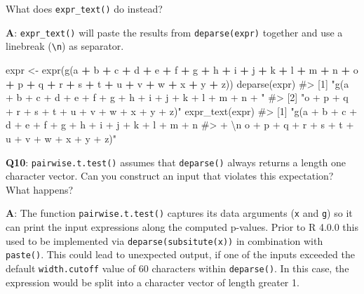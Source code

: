 \documentclass[
]{krantz}
\makeatletter
\newenvironment{Shaded}{\begin{snugshade}}{\end{snugshade}}
\newcommand{\CommentTok}[1]{\textcolor[rgb]{0.56,0.35,0.01}{\textit{#1}}}
\newcommand{\KeywordTok}[1]{\textcolor[rgb]{0.13,0.29,0.53}{\textbf{#1}}}
\newcommand{\NormalTok}[1]{#1}
\newcommand{\OperatorTok}[1]{\textcolor[rgb]{0.81,0.36,0.00}{\textbf{#1}}}
\newcommand{\StringTok}[1]{\textcolor[rgb]{0.31,0.60,0.02}{#1}}
\newenvironment{kframe}{%
\medskip{}
\setlength{\fboxsep}{.8em}
 \def\at@end@of@kframe{}%
 \ifinner\ifhmode%
  \def\at@end@of@kframe{\end{minipage}}%
  \begin{minipage}{\columnwidth}%
 \fi\fi%
 \def\FrameCommand##1{\hskip\@totalleftmargin \hskip-\fboxsep
 \colorbox{shadecolor}{##1}\hskip-\fboxsep
     \hskip-\linewidth \hskip-\@totalleftmargin \hskip\columnwidth}%
 \MakeFramed {\advance\hsize-\width
   \@totalleftmargin\z@ \linewidth\hsize
   \@setminipage}}%
 {\par\unskip\endMakeFramed%
 \at@end@of@kframe}
\renewenvironment{Shaded}{\begin{kframe}}{\end{kframe}}
\renewcommand{\KeywordTok} [1]{\textcolor[rgb]{0.00,0.44,0.13}{{#1}}}
\renewcommand{\StringTok}  [1]{\textcolor[rgb]{0.25,0.44,0.63}{{#1}}}
\renewcommand{\CommentTok} [1]{\textcolor[rgb]{0.38,0.63,0.69}{{#1}}}
\renewcommand{\NormalTok}  [1]{{#1}}
\makeatother
\begin{document}
What does \texttt{expr\_text()} do instead?

\textbf{{A}}: \texttt{expr\_text()} will paste the results from \texttt{deparse(expr)} together and use a linebreak (\texttt{\textbackslash{}n}) as separator.

\begin{Shaded}
\begin{Highlighting}[]
\NormalTok{expr <-}\StringTok{ }\KeywordTok{expr}\NormalTok{(}\KeywordTok{g}\NormalTok{(a }\OperatorTok{+}\StringTok{ }\NormalTok{b }\OperatorTok{+}\StringTok{ }\NormalTok{c }\OperatorTok{+}\StringTok{ }\NormalTok{d }\OperatorTok{+}\StringTok{ }\NormalTok{e }\OperatorTok{+}\StringTok{ }\NormalTok{f }\OperatorTok{+}\StringTok{ }\NormalTok{g }\OperatorTok{+}\StringTok{ }\NormalTok{h }\OperatorTok{+}\StringTok{ }\NormalTok{i }\OperatorTok{+}\StringTok{ }\NormalTok{j }\OperatorTok{+}\StringTok{ }\NormalTok{k }\OperatorTok{+}\StringTok{ }\NormalTok{l }\OperatorTok{+}\StringTok{ }\NormalTok{m }\OperatorTok{+}\StringTok{ }
\StringTok{                 }\NormalTok{n }\OperatorTok{+}\StringTok{ }\NormalTok{o }\OperatorTok{+}\StringTok{ }\NormalTok{p }\OperatorTok{+}\StringTok{ }\NormalTok{q }\OperatorTok{+}\StringTok{ }\NormalTok{r }\OperatorTok{+}\StringTok{ }\NormalTok{s }\OperatorTok{+}\StringTok{ }\NormalTok{t }\OperatorTok{+}\StringTok{ }\NormalTok{u }\OperatorTok{+}\StringTok{ }\NormalTok{v }\OperatorTok{+}\StringTok{ }\NormalTok{w }\OperatorTok{+}\StringTok{ }\NormalTok{x }\OperatorTok{+}\StringTok{ }\NormalTok{y }\OperatorTok{+}\StringTok{ }\NormalTok{z))}
\KeywordTok{deparse}\NormalTok{(expr)}
\CommentTok{#> [1] "g(a + b + c + d + e + f + g + h + i + j + k + l + m + n + "}
\CommentTok{#> [2] "o + p + q + r + s + t + u + v + w + x + y + z)"}
\KeywordTok{expr_text}\NormalTok{(expr)}
\CommentTok{#> [1] "g(a + b + c + d + e + f + g + h + i + j + k + l + m + n }
\CommentTok{#> + \textbackslash{}n    o + p + q + r + s + t + u + v + w + x + y + z)"}
\end{Highlighting}
\end{Shaded}

\textbf{{Q10}}: \texttt{pairwise.t.test()} assumes that \texttt{deparse()} always returns a length one character vector. Can you construct an input that violates this expectation? What happens?

\textbf{{A}}: The function \texttt{pairwise.t.test()} captures its data arguments (\texttt{x} and \texttt{g}) so it can print the input expressions along the computed p-values. Prior to R 4.0.0 this used to be implemented via \texttt{deparse(subsitute(x))} in combination with \texttt{paste()}. This could lead to unexpected output, if one of the inputs exceeded the default \texttt{width.cutoff} value of 60 characters within \texttt{deparse()}. In this case, the expression would be split into a character vector of length greater 1.
\end{document}
